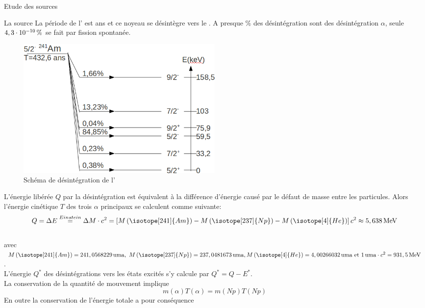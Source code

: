 \documentclass[a4paper,11pt]{scrartcl}
\begin{document}
 \begin{section}{Etude des sources}
  \begin{subsection}{La source }
   La période de l' est \unit[432,6]{ans} et ce noyeau se désintègre vers le . A presque \unit[100]{\%} des désintégration sont des désintégration $\alpha$, seule $\unit[4,3\cdot10^{-10}]{\%}$ 
   se fait par fission spontanée.\\
   \begin{figure}[H]
    \begin{center}
     \includegraphics[width=0.5\textwidth]{Bilder/schemaAm1.png}
    \end{center}
    \caption{Schéma de désintégration de l'}
   \end{figure}
   L'énergie libérée $Q$ par la désintégration est équivalent à la différence d'énergie causé par le défaut de masse entre les particules. Alors l'énergie cinétique $T$ des trois $\alpha$ principaux se calculent comme suivante:
   \begin{equation*}
    Q=\Delta E\stackrel{Einstein}{=}\Delta M\cdot c^2=\left[M\left(\isotope[241]{Am}\right)-M\left(\isotope[237]{Np}\right)-M\left(\isotope[4]{He}\right)\right]c^2\approx\unit[5,638]{MeV}
   \end{equation*}\\
   avec $M\left(\isotope[241]{Am}\right)=\unit[241,0568229]{uma},\text{ }M\left(\isotope[237]{Np}\right)=\unit[237,0481673]{uma}, \\ M\left(\isotope[4]{He}\right)=\unit[4,00266032]{uma}\text{ et }\unit[1]{uma}\cdot c^2=\unit[931,5]{MeV}$.\\
   L'énergie $Q^{\ast}$ des désintégrations vers les états excités s'y calcule par $Q^{\ast}=Q-E^{\ast}$.\\
   La conservation de la quantité de mouvement implique
   \begin{equation*}
    m(\alpha)T(\alpha)=m(Np)T(Np)
   \end{equation*}
   En outre la conservation de l'énergie totale a pour conséquence

\end{subsection}
\end{section}
\end{document}
